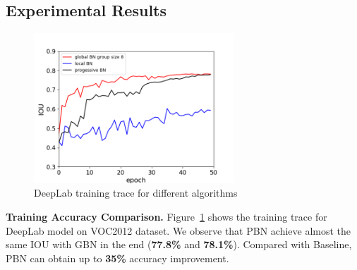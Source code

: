 \documentclass{llncs}
\begin{document}
\subsection{Experimental Results}


\begin{figure}
    \centering
    \includegraphics[width=7.5cm]{figure/progressiveBN.png}
    \caption{DeepLab training trace for different algorithms}
    \label{fig:progressiveBN}
\end{figure}


{\bf Training Accuracy Comparison.} Figure~\ref{fig:progressiveBN} shows the training trace for DeepLab model on VOC2012 dataset. We observe that PBN achieve almost the same IOU with GBN in the end (\textbf{77.8\%} and \textbf{78.1\%}).
Compared with  Baseline, PBN can obtain up to {\bf 35\%} accuracy improvement. %

\end{document}
